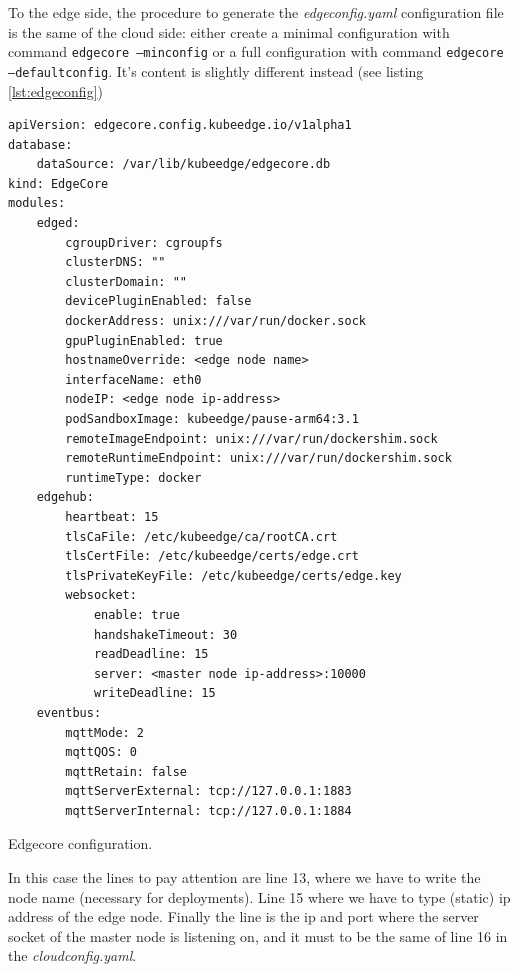 To the edge side, the procedure to generate the \textit{edgeconfig.yaml} configuration file is the same of the cloud side: either create a minimal configuration with command \texttt{edgecore --minconfig} or a full configuration with command \texttt{edgecore --defaultconfig}. It's content is slightly different instead (see listing \ref{lst:edgeconfig})

\begin{listing}[H]
\begin{verbatim}
apiVersion: edgecore.config.kubeedge.io/v1alpha1
database:
    dataSource: /var/lib/kubeedge/edgecore.db
kind: EdgeCore
modules:
    edged:
        cgroupDriver: cgroupfs
        clusterDNS: ""
        clusterDomain: ""
        devicePluginEnabled: false
        dockerAddress: unix:///var/run/docker.sock
        gpuPluginEnabled: true
        hostnameOverride: <edge node name>
        interfaceName: eth0
        nodeIP: <edge node ip-address>
        podSandboxImage: kubeedge/pause-arm64:3.1
        remoteImageEndpoint: unix:///var/run/dockershim.sock
        remoteRuntimeEndpoint: unix:///var/run/dockershim.sock
        runtimeType: docker
    edgehub:
        heartbeat: 15
        tlsCaFile: /etc/kubeedge/ca/rootCA.crt
        tlsCertFile: /etc/kubeedge/certs/edge.crt
        tlsPrivateKeyFile: /etc/kubeedge/certs/edge.key
        websocket:
            enable: true
            handshakeTimeout: 30
            readDeadline: 15
            server: <master node ip-address>:10000
            writeDeadline: 15
    eventbus:
        mqttMode: 2
        mqttQOS: 0
        mqttRetain: false
        mqttServerExternal: tcp://127.0.0.1:1883
        mqttServerInternal: tcp://127.0.0.1:1884
\end{verbatim}
\caption{Edgecore configuration.}
\label{lst:edgeconfig}
\end{listing}


In this case the lines to pay attention are line 13, where we have to write the node name (necessary for deployments). Line 15 where we have to type (static) ip address of the edge node. Finally the line is the ip and port where the server socket of the master node is listening on, and it must to be the same of line 16 in the \textit{cloudconfig.yaml}.

